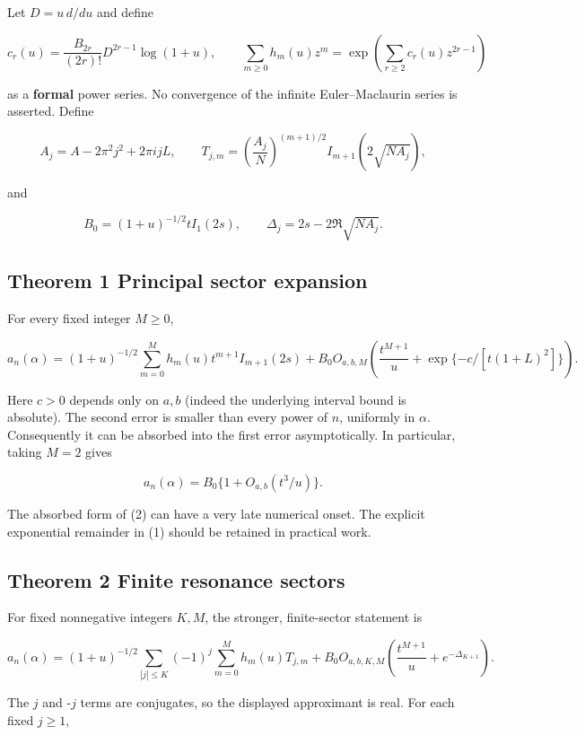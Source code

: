 \documentclass[11pt,letterpaper]{article}
\begin{document}
Let \(D=u\,d/du\) and define

\[
 c_r(u)=\frac{B_{2r}}{(2r)!}D^{2r-1}\log(1+u),\qquad
 \sum_{m\ge0}h_m(u)z^m
 =\exp\left(\sum_{r\ge2}c_r(u)z^{2r-1}\right)
\]

as a \textbf{formal} power series. No convergence of the infinite
Euler--Maclaurin series is asserted. Define

\[
 A_j=A-2\pi^2j^2+2\pi i jL,\qquad
 T_{j,m}=\left(\frac{A_j}{N}\right)^{(m+1)/2}
 I_{m+1}(2\sqrt{NA_j}),
\]

and

\[
 B_0=(1+u)^{-1/2}tI_1(2s),\qquad
 \Delta_j=2s-2\Re\sqrt{NA_j}.
\]

\subsection{Theorem 1 Principal sector expansion}\label{mfp:principal-sector-theorem}

For every fixed integer \(M\ge0\),

\[
 a_n(\alpha)=(1+u)^{-1/2}\sum_{m=0}^{M}h_m(u)t^{m+1}I_{m+1}(2s)
 +B_0 O_{a,b,M}\left(\frac{t^{M+1}}{u}
 +\exp\{-c/[t(1+L)^2]\}\right). \tag{1}
\]

Here \(c>0\) depends only on \(a,b\) (indeed the underlying interval
bound is absolute). The second error is smaller than every power of
\(n\), uniformly in \(\alpha\). Consequently it can be absorbed into the
first error asymptotically. In particular, taking \(M=2\) gives

\[
 a_n(\alpha)=B_0\{1+O_{a,b}(t^3/u)\}. \tag{2}
\]

The absorbed form of (2) can have a very late numerical onset. The
explicit exponential remainder in (1) should be retained in practical
work.

\subsection{Theorem 2 Finite resonance sectors}\label{mfp:finite-resonance-sector-theorem}

For fixed nonnegative integers \(K,M\), the stronger, finite-sector
statement is

\[
 a_n(\alpha)=(1+u)^{-1/2}
 \sum_{|j|\le K}(-1)^j\sum_{m=0}^{M}h_m(u)T_{j,m}
 +B_0 O_{a,b,K,M}\left(\frac{t^{M+1}}{u}+e^{-\Delta_{K+1}}\right). \tag{3}
\]

The \(j\) and -\(j\) terms are conjugates, so the displayed approximant
is real. For each fixed \(j\ge1\),
\end{document}
